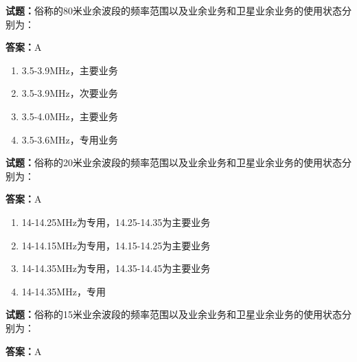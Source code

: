 \documentclass{ctexbook}
\begin{document}




\vspace{1em}

\textbf{试题：}俗称的80米业余波段的频率范围以及业余业务和卫星业余业务的使用状态分别为： 

\textbf{答案：}A 

\begin{enumerate}[leftmargin=3em]
  \item 3.5-3.9MHz，主要业务 

  \item 3.5-3.9MHz，次要业务 

  \item 3.5-4.0MHz，主要业务 

  \item 3.5-3.6MHz，专用业务 

\end{enumerate}






\vspace{1em}

\textbf{试题：}俗称的20米业余波段的频率范围以及业余业务和卫星业余业务的使用状态分别为： 

\textbf{答案：}A 

\begin{enumerate}[leftmargin=3em]
  \item 14-14.25MHz为专用，14.25-14.35为主要业务 

  \item 14-14.15MHz为专用，14.15-14.25为主要业务 

  \item 14-14.35MHz为专用，14.35-14.45为主要业务 

  \item 14-14.35MHz，专用 

\end{enumerate}





\vspace{1em}

\textbf{试题：}俗称的15米业余波段的频率范围以及业余业务和卫星业余业务的使用状态分别为： 

\textbf{答案：}A 
\end{document}
